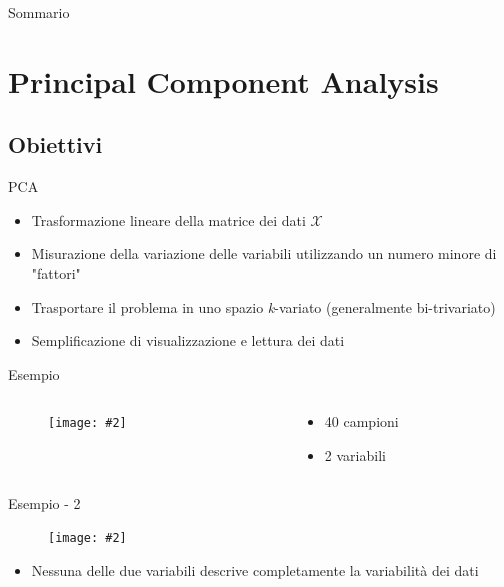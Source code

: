 \documentclass[xcolor={dvipsnames}]{beamer}
\newcommand{\figcen}[2]{
	\begin{figure}
		\begin{center}
			\texttt{[image: \#2]}
		\end{center}
	\end{figure}
}
\begin{document}
\begin{frame}{Sommario}

\tableofcontents

\end{frame}

\section{Principal Component Analysis}

	\subsection{Obiettivi}
	
		\begin{frame}{PCA}
			\begin{itemize}
				\item Trasformazione lineare della matrice dei dati $\mathcal{X}$
				\item Misurazione della variazione delle variabili utilizzando un numero minore di "fattori"
				\item Trasportare il problema in uno spazio \emph{k}-variato (generalmente bi-trivariato)
				\item Semplificazione di visualizzazione e lettura dei dati
			\end{itemize}
		\end{frame}


		\begin{frame}{Esempio}
			\begin{columns}
				\begin{column}{0.5\textwidth}
					\figcen{\columnwidth}{plotTeoria}
				\end{column}
				\begin{column}{0.5\textwidth}
					\begin{itemize}
						\item 40 campioni
						\item 2 variabili
					\end{itemize}
				\end{column}
			\end{columns}			
		\end{frame}

		\begin{frame}{Esempio - 2}
			\figcen{.8\textwidth}{proiezione}
			\begin{itemize}
				\item Nessuna delle due variabili descrive completamente la variabilità dei dati
			\end{itemize}
		\end{frame}
\end{document}
